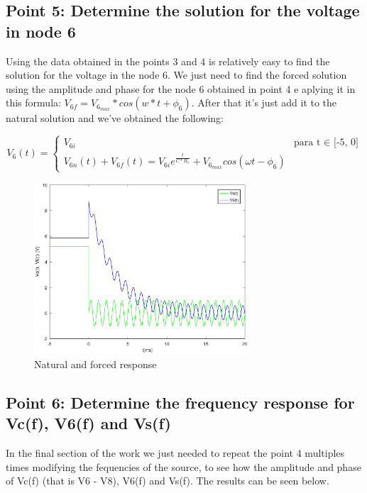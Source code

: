 \subsection{Point 5: Determine the solution for the voltage in node 6}


Using the data obtained in the points 3 and 4 is relatively easy to find the solution for the voltage in the node 6. We just need to find the forced solution using the amplitude and phase for the node 6 obtained in point 4 e aplying it in this formula: $V_{6f} = V_{6_{max}}*cos(w*t + \phi_{6})$. After that it's just add it to the natural solution and we've obtained the following:

\begin{equation}
 V_{6}(t)=
    \begin{cases}
      V_{6i} & \text{para t $\in$ [-5, 0]}\\
      V_{6n}(t) + V_{6f}(t) = V_{6i}e^\frac{t}{C*R_5} + V_{6_{max}}cos(\omega t - \phi _6)
    \end{cases}       
\end{equation}

\begin{figure}[H]
\centering
\includegraphics[width = 8cm]{Solution.eps}
\caption {Natural and forced response}
\end{figure}


\subsection{Point 6: Determine the frequency response for Vc(f), V6(f) and Vs(f)}

In the final section of the work we just needed to repeat the point 4 multiples times modifying the fequencies of the source, to see how the amplitude and phase of Vc(f) (that is V6 - V8), V6(f) and Vs(f). The results can be seen below.

